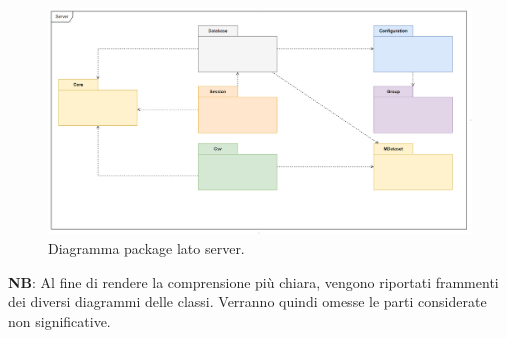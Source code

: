\documentclass[../manuale_sviluppatore.tex]{subfiles}
\begin{document}
\begin{figure}[H]
	\centering
	\includegraphics[width=18cm]{src/img/package-server.png}
	\caption{Diagramma package lato server.}
\end{figure}

\textbf{NB}: Al fine di rendere la comprensione più chiara, vengono riportati frammenti dei diversi diagrammi delle classi.
Verranno quindi omesse le parti considerate non significative.
\newpage
\end{document}
